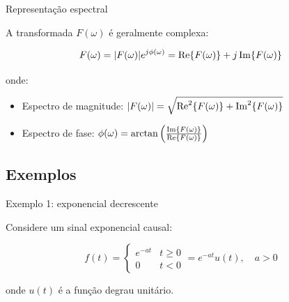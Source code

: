 \begin{frame}{Representação espectral}

A transformada $F(\omega)$ é geralmente complexa:

\[
F(\omega) = |F(\omega)| e^{j\phi(\omega)} = \operatorname{Re}\{F(\omega)\} + j\operatorname{Im}\{F(\omega)\}
\]

onde:

\begin{itemize}
\item<2-> Espectro de magnitude: $|F(\omega)| = \sqrt{\operatorname{Re}^2\{F(\omega)\} + \operatorname{Im}^2\{F(\omega)\}}$
\item<3-> Espectro de fase: $\phi(\omega) = \arctan\left(\frac{\operatorname{Im}\{F(\omega)\}}{\operatorname{Re}\{F(\omega)\}}\right)$
\end{itemize}

\vspace{0.4cm}



\end{frame}


\subsection{Exemplos}

\begin{frame}{Exemplo 1: exponencial decrescente}

Considere um sinal exponencial causal:

\[
f(t) = \begin{cases}
e^{-at} & t \geq 0 \\
0 & t < 0
\end{cases} = e^{-at} u(t), \quad a > 0
\]

onde $u(t)$ é a função degrau unitário.



\end{frame}

